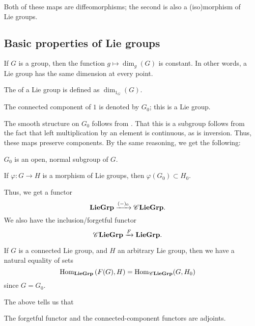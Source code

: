 \documentclass[12pt]{article}
\begin{document}
Both of these maps are diffeomorphisms; the second is also a (iso)morphism of Lie groups.

\subsection{Basic properties of Lie groups}

\begin{thm}
	If $G$ is a group, then the function $g \mapsto \dim_{g}(G)$ is constant. 
	In other words, a Lie group has the same dimension at every point.
\end{thm}

\begin{defn}
	The  of a Lie group is defined as $\dim_{1_{G}}(G)$.
\end{defn}

\begin{defn}
	The connected component of $1$ is denoted by $G_{0}$; this is a Lie group.
\end{defn}
The smooth structure on $G_{0}$ follows from . 
That this is a subgroup follows from the fact that left multiplication by an element is continuous, as is inversion. 
Thus, these maps preserve components. 
By the same reasoning, we get the following:

\begin{thm}
	$G_{0}$ is an open, normal subgroup of $G$.

	If $\varphi \colon G \to H$ is a morphism of Lie groups, then $\varphi(G_{0}) \subset H_{0}$.
\end{thm}

Thus, we get a functor
\begin{equation*} 
	\mathbf{LieGrp} \xrightarrow{(-)_{0}} \mathscr{C}\mathbf{LieGrp}.
\end{equation*}
We also have the inclusion/forgetful functor
\begin{equation*} 
	\mathscr{C}\mathbf{LieGrp} \xrightarrow{F} \mathbf{LieGrp}.
\end{equation*}

If $G$ is a connected Lie group, and $H$ an arbitrary Lie group, 
then we have a natural equality of sets
\begin{equation*} 
	\operatorname{Hom}_{\mathbf{LieGrp}}\left(F(G), H\right) = \operatorname{Hom}_{\mathscr{C}\mathbf{LieGrp}}(G, H_{0})
\end{equation*}
since $G = G_{0}$. 

The above tells us that
\begin{thm}
	The forgetful functor and the connected-component functors are adjoints.
\end{thm}
\end{document}
